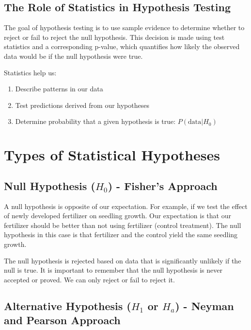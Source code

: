 \documentclass[
]{book}
\providecommand{\tightlist}{%
  \setlength{\itemsep}{0pt}\setlength{\parskip}{0pt}}
\begin{document}
\subsection{The Role of Statistics in Hypothesis Testing}\label{the-role-of-statistics-in-hypothesis-testing}

The goal of hypothesis testing is to use sample evidence to determine whether to reject or fail to reject the null hypothesis. This decision is made using test statistics and a corresponding p-value, which quantifies how likely the observed data would be if the null hypothesis were true.

Statistics help us:

\begin{enumerate}
\def\labelenumi{\arabic{enumi}.}
\tightlist
\item
  Describe patterns in our data
\item
  Test predictions derived from our hypotheses
\item
  Determine probability that a given hypothesis is true: \(P(\text{data}|H_0)\)
\end{enumerate}

\section{Types of Statistical Hypotheses}\label{types-of-statistical-hypotheses}

\subsection{\texorpdfstring{Null Hypothesis (\(H_0\)) - Fisher's Approach}{Null Hypothesis (H\_0) - Fisher's Approach}}\label{null-hypothesis-h_0---fishers-approach}

A null hypothesis is opposite of our expectation. For example, if we test the effect of newly developed fertilizer on seedling growth. Our expectation is that our fertilizer should be better than not using fertilizer (control treatment). The null hypothesis in this case is that fertilizer and the control yield the same seedling growth.

The null hypothesis is rejected based on data that is significantly unlikely if the null is true. It is important to remember that the null hypothesis is never accepted or proved. We can only reject or fail to reject it.

\subsection{\texorpdfstring{Alternative Hypothesis (\(H_1\) or \(H_a\)) - Neyman and Pearson Approach}{Alternative Hypothesis (H\_1 or H\_a) - Neyman and Pearson Approach}}\label{alternative-hypothesis-h_1-or-h_a---neyman-and-pearson-approach}
\end{document}

